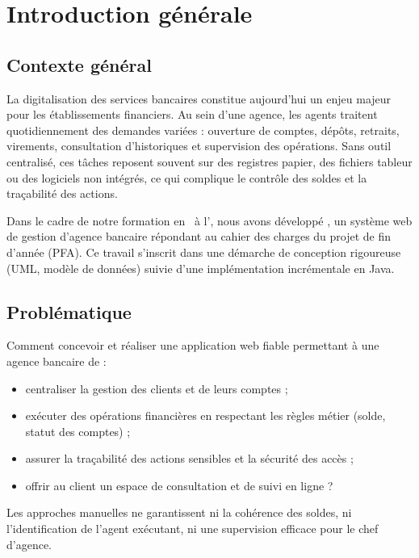 \chapter*{Introduction générale}
\label{ch:intro}

\section{Contexte général}

La digitalisation des services bancaires constitue aujourd'hui un enjeu majeur pour les établissements financiers. Au sein d'une agence, les agents traitent quotidiennement des demandes variées : ouverture de comptes, dépôts, retraits, virements, consultation d'historiques et supervision des opérations. Sans outil centralisé, ces tâches reposent souvent sur des registres papier, des fichiers tableur ou des logiciels non intégrés, ce qui complique le contrôle des soldes et la traçabilité des actions.

Dans le cadre de notre formation en \filiere\ à l'\ecole, nous avons développé \textbf{\nomapplication}, un système web de gestion d'agence bancaire répondant au cahier des charges du projet de fin d'année (PFA). Ce travail s'inscrit dans une démarche de conception rigoureuse (UML, modèle de données) suivie d'une implémentation incrémentale en Java.

\section{Problématique}

Comment concevoir et réaliser une application web fiable permettant à une agence bancaire de :
\begin{itemize}[leftmargin=*]
    \item centraliser la gestion des clients et de leurs comptes ;
    \item exécuter des opérations financières en respectant les règles métier (solde, statut des comptes) ;
    \item assurer la traçabilité des actions sensibles et la sécurité des accès ;
    \item offrir au client un espace de consultation et de suivi en ligne ?
\end{itemize}

Les approches manuelles ne garantissent ni la cohérence des soldes, ni l'identification de l'agent exécutant, ni une supervision efficace pour le chef d'agence.


